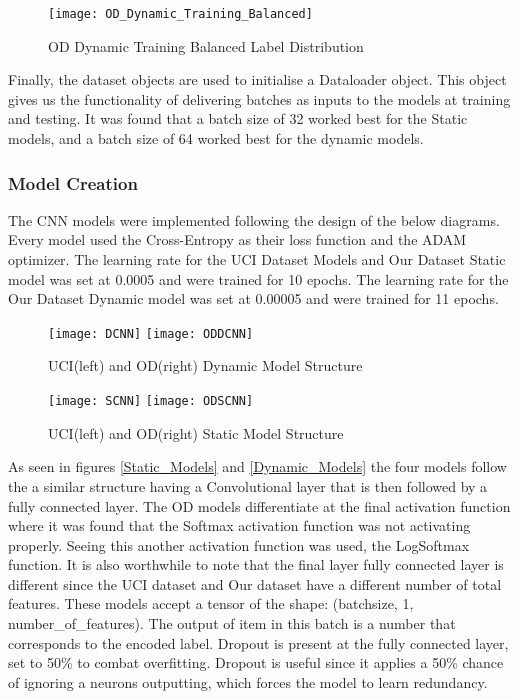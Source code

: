 \begin{figure}[H]
\centering
\texttt{[image: OD\_Dynamic\_Training\_Balanced]}\hfill
\caption*{OD Dynamic Training Balanced Label Distribution}
\label{fig:Balanced_Train}
\end{figure}

Finally, the dataset objects are used to initialise a Dataloader object.
This object gives us the functionality of delivering batches as inputs to the models at training and testing.
It was found that a batch size of 32 worked best for the Static models, and a batch size of 64 worked best for the dynamic models.

\subsubsection{Model Creation}
The CNN models were implemented following the design of the below diagrams.
Every model used the Cross-Entropy as their loss function and the ADAM optimizer.
The learning rate for the UCI Dataset Models and Our Dataset Static model was set at 0.0005 and were trained for 10 epochs.
The learning rate for the Our Dataset Dynamic model was set at 0.00005 and were trained for 11 epochs.

\begin{figure}[H]
\centering
\texttt{[image: DCNN]}\hfill
\texttt{[image: ODDCNN]}\hfill
\caption*{UCI(left) and OD(right) Dynamic Model Structure}
\label{fig:Dynamic_Models}
\end{figure}

\begin{figure}[H]
\centering
\texttt{[image: SCNN]}\hfill
\texttt{[image: ODSCNN]}\hfill
\caption*{UCI(left) and OD(right) Static Model Structure}
\label{fig:Static_Models}
\end{figure}

As seen in figures \ref{Static_Models} and \ref{Dynamic_Models} the four models follow the a similar structure having a Convolutional layer that is then followed by a fully connected layer.
The OD models differentiate at the final activation function where it was found that the Softmax activation function was not activating properly.
Seeing this another activation function was used, the LogSoftmax function.
It is also worthwhile to note that the final layer fully connected layer is different since the UCI dataset and Our dataset have a different number of total features.
These models accept a tensor of the shape: (batchsize, 1, number\_of\_features).
The output of item in this batch is a number that corresponds to the encoded label.
Dropout is present at the fully connected layer, set to 50\% to combat overfitting.
Dropout is useful since it applies a 50\% chance of ignoring a neurons outputting, which forces the model to learn redundancy.